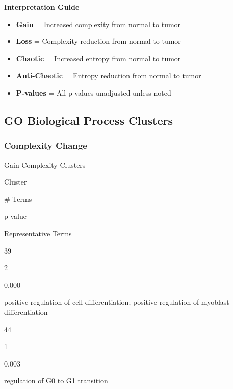 \documentclass[
  letterpaper,
  DIV=11,
  numbers=noendperiod,
  openany,
  oneside]{scrreprt}
\providecommand{\tightlist}{%
  \setlength{\itemsep}{0pt}\setlength{\parskip}{0pt}}
\begin{document}
\begin{tcolorbox}[enhanced jigsaw, opacityback=0, colframe=quarto-callout-note-color-frame, toptitle=1mm, colback=white, breakable, toprule=.15mm, bottomrule=.15mm, opacitybacktitle=0.6, title=\textcolor{quarto-callout-note-color}{\faInfo}\hspace{0.5em}{Note}, coltitle=black, rightrule=.15mm, leftrule=.75mm, left=2mm, bottomtitle=1mm, titlerule=0mm, colbacktitle=quarto-callout-note-color!10!white, arc=.35mm]

\textbf{Interpretation Guide}

\begin{itemize}
\tightlist
\item
  \textbf{Gain} = Increased complexity from normal to tumor
\item
  \textbf{Loss} = Complexity reduction from normal to tumor
\item
  \textbf{Chaotic} = Increased entropy from normal to tumor
\item
  \textbf{Anti-Chaotic} = Entropy reduction from normal to tumor
\item
  \textbf{P-values} = All p-values unadjusted unless noted
\end{itemize}

\end{tcolorbox}

\subsection{GO Biological Process Clusters}

\subsubsection{Complexity Change}

Gain Complexity Clusters

Cluster

\# Terms

p-value

Representative Terms

39

2

0.000

positive regulation of cell differentiation; positive regulation of
myoblast differentiation

44

1

0.003

regulation of G0 to G1 transition
\end{document}
